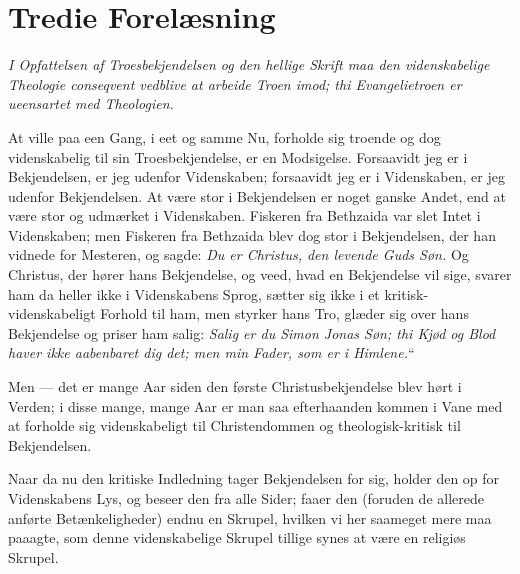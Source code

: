 \documentclass[12pt,a4paper]{book}
\newcommand{\opage}[1]{\marginnote{\footnotesize\textit{[#1]}}}
\begin{document}
\chapter*{Tredie Forelæsning}
\label{ch:forel3}

\begin{center}\itshape
I Opfattelsen af Troesbekjendelsen og den hellige Skrift maa den
videnskabelige Theologie conseqvent vedblive at arbeide Troen imod;
thi Evangelietroen er ueensartet med Theologien.
\end{center}

\opage{26} At ville paa een Gang, i eet og samme Nu, forholde sig troende
og dog videnskabelig til sin Troesbekjendelse, er en Modsigelse.
Forsaavidt jeg er i Bekjendelsen, er jeg udenfor Videnskaben;
forsaavidt jeg er i Videnskaben, er jeg udenfor Bekjendelsen. At
være stor i Bekjendelsen er noget ganske Andet, end at være stor og
udmærket i Videnskaben. Fiskeren fra Bethzaida var slet Intet i
Videnskaben; men Fiskeren fra Bethzaida blev dog stor i Bekjendelsen,
der han vidnede for Mesteren, og sagde: \emph{Du er Christus, den
levende Guds Søn.} Og Christus, der hører hans Bekjendelse, og veed,
hvad en Bekjendelse vil sige, svarer ham da heller ikke i
Videnskabens Sprog, sætter sig ikke i et kritisk-videnskabeligt
Forhold til ham, men styrker hans Tro, glæder sig over hans
Bekjendelse og priser ham salig: \emph{Salig er du Simon Jonas Søn;
thi Kjød og Blod haver ikke aabenbaret dig det; men min Fader, som
er i Himlene.}“

Men --- det er mange Aar siden den første Christusbekjendelse blev
hørt i Verden; i disse mange, mange Aar er man saa efterhaanden
kommen i Vane med at forholde sig videnskabeligt til Christendommen
og theologisk-kritisk til Bekjendelsen.

\opage{27} Naar da nu den kritiske Indledning tager Bekjendelsen for sig,
holder den op for Videnskabens Lys, og beseer den fra alle Sider;
faaer den (foruden de allerede anførte Betænkeligheder) endnu en
Skrupel, hvilken vi her saameget mere maa paaagte, som denne
videnskabelige Skrupel tillige synes at være en religiøs Skrupel.
\end{document}
